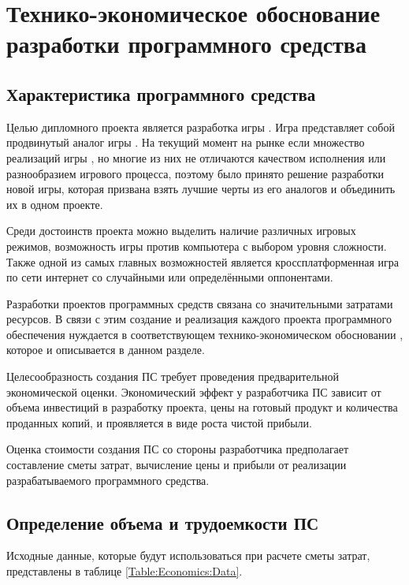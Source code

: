 



\section{Технико-экономическое обоснование разработки программного средства}
\subsection{Характеристика программного средства}

Целью дипломного проекта является разработка игры \BinaryWars. Игра представляет собой продвинутый аналог игры \TicTacToe. На текущий момент на рынке если множество реализаций игры \TicTacToe, но многие из них не отличаются качеством исполнения или разнообразием игрового процесса, поэтому было принято решение разработки новой игры, которая призвана взять лучшие черты из его аналогов и объединить их в одном проекте.

Среди достоинств проекта можно выделить наличие различных игровых режимов, возможность игры против компьютера с выбором уровня сложности. Также одной из самых главных возможностей является кроссплатформенная игра по сети интернет со случайными или определёнными оппонентами.

Разработки проектов программных средств связана со значительными затратами ресурсов. В связи с этим создание и реализация каждого проекта программного обеспечения нуждается в соответствующем технико-экономическом обосновании \cite{Palitsyn, Gorovoi}, которое и описывается в данном разделе.

Целесообразность создания ПС требует проведения предварительной экономической оценки. Экономический эффект у разработчика ПС зависит от объема инвестиций в разработку проекта, цены на готовый продукт и количества проданных копий, и проявляется в виде роста чистой прибыли.

Оценка стоимости создания ПС со стороны разработчика предполагает составление сметы затрат, вычисление цены и прибыли от реализации разрабатываемого программного средства.


\subsection{Определение объема и трудоемкости ПС}

Исходные данные, которые будут использоваться при расчете сметы затрат, представлены в таблице \ref{Table:Economics:Data}.

